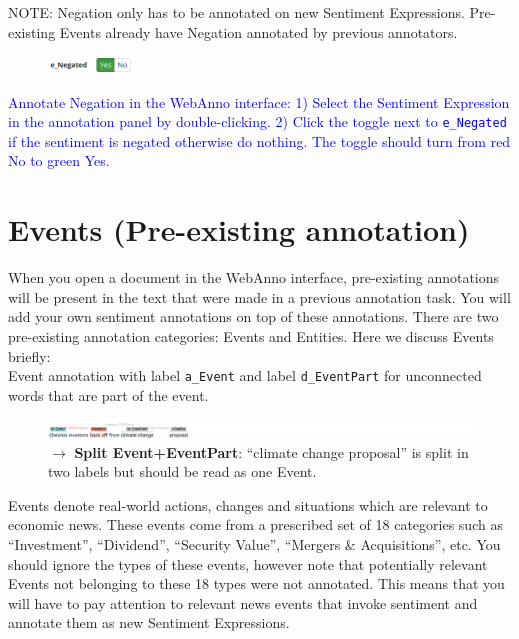 \noindent
\textcolor{BrickRed}{NOTE: Negation only has to be annotated on new Sentiment Expressions. Pre-existing Events already have Negation annotated by previous annotators.}\\

\begin{figure}
    \centering
    \includegraphics[width=0.2\textwidth]{img/negationui.png}
    \label{fig:negationui}
\end{figure}

\noindent
\textcolor{Blue}{Annotate Negation in the WebAnno interface:
1) Select the Sentiment Expression in the annotation panel by double-clicking.
2) Click the toggle next to \texttt{e\_Negated} if the sentiment is negated otherwise do nothing. The toggle should turn from red No to green Yes.}

\section{Events (Pre-existing annotation)}
\label{sec:eventdefinition}
When you open a document in the WebAnno interface, pre-existing annotations will be present in the text that were made in a previous annotation task.
You will add your own sentiment annotations on top of these annotations.
There are two pre-existing annotation categories: Events and Entities.
Here we discuss Events briefly:\\
\eventcolor Event annotation with label \texttt{a\_Event} and label \texttt{d\_EventPart} for unconnected words that are part of the event.

\begin{figure}[!htb]
    \centering
    \includegraphics[width=\textwidth]{img/cvx00s01 event part.png}
    \caption*{$\rightarrow$ \textbf{Split Event+EventPart}: ``climate change proposal'' is split in two labels but should be read as one Event.}
\end{figure}

Events denote real-world actions, changes and situations which are relevant to economic news.
These events come from a prescribed set of 18 categories such as ``Investment'', ``Dividend'', ``Security Value'', ``Mergers \& Acquisitions'', etc. 
You should ignore the types of these events, however note that potentially relevant Events not belonging to these 18 types were not annotated.
This means that you will have to pay attention to relevant news events that invoke sentiment and annotate them as new Sentiment Expressions.\\

